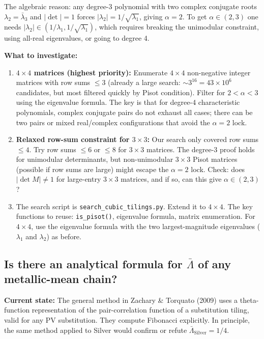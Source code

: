 \documentclass[11pt,letterpaper]{article}
\begin{document}
The algebraic reason: any degree-3 polynomial with two complex conjugate roots $\lambda_2=\bar\lambda_3$
and $|\det|=1$ forces $|\lambda_2|=1/\sqrt{\lambda_1}$, giving $\alpha=2$.
To get $\alpha\in(2,3)$ one needs $|\lambda_2| \in (1/\lambda_1, 1/\sqrt{\lambda_1})$,
which requires breaking the unimodular constraint, using all-real eigenvalues,
or going to degree 4.

\textbf{What to investigate:}
\begin{enumerate}[leftmargin=2em]
  \item \textbf{$4\times4$ matrices (highest priority):}
    Enumerate $4\times4$ non-negative integer matrices with row sums $\leq3$
    (already a large search: $\sim3^{16} = 43\times10^6$ candidates, but most filtered
    quickly by Pisot condition). Filter for $2<\alpha<3$ using the eigenvalue formula.
    The key is that for degree-4 characteristic polynomials, complex conjugate pairs
    do not exhaust all cases; there can be two pairs or mixed real/complex configurations
    that avoid the $\alpha=2$ lock.
  \item \textbf{Relaxed row-sum constraint for $3\times3$:}
    Our search only covered row sums $\leq4$. Try row sums $\leq6$ or $\leq8$
    for $3\times3$ matrices. The degree-3 proof holds for unimodular determinants,
    but non-unimodular $3\times3$ Pisot matrices (possible if row sums are large) might
    escape the $\alpha=2$ lock. Check: does $|\det M|\neq1$ for large-entry $3\times3$
    matrices, and if so, can this give $\alpha\in(2,3)$?
  \item The search script is \texttt{search\_cubic\_tilings.py}. Extend it to $4\times4$.
    The key functions to reuse: \texttt{is\_pisot()}, eigenvalue formula, matrix enumeration.
    For $4\times4$, use the eigenvalue formula with the two largest-magnitude eigenvalues
    ($\lambda_1$ and $\lambda_2$) as before.
\end{enumerate}

\subsection{Is there an analytical formula for $\bar\Lambda$ of any metallic-mean chain?}

\textbf{Current state:}
The general method in Zachary \& Torquato (2009) uses a theta-function representation
of the pair-correlation function of a substitution tiling, valid for any PV substitution.
They compute Fibonacci explicitly. In principle, the same method applied to Silver would
confirm or refute $\bar\Lambda_\text{Silver}=1/4$.
\end{document}
